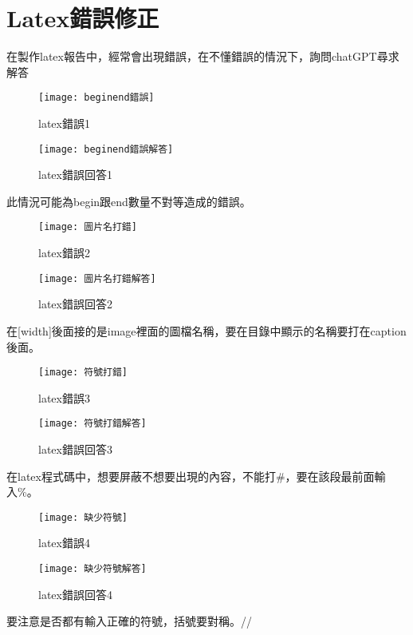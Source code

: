 \chapter{Latex錯誤修正}
在製作latex報告中，經常會出現錯誤，在不懂錯誤的情況下，詢問chatGPT尋求解答
\begin{figure}[ht]
  \begin{minipage}{0.5\textwidth}
    \centering
    \texttt{[image: beginend錯誤]}
    \caption{latex錯誤1}
  \end{minipage}%
  \begin{minipage}{0.5\textwidth}
    \centering
    \texttt{[image: beginend錯誤解答]}
    \caption{latex錯誤回答1}
  \end{minipage}
\end{figure}
此情況可能為begin跟end數量不對等造成的錯誤。\\
\begin{figure}[ht]
  \begin{minipage}{0.5\textwidth}
    \centering
    \texttt{[image: 圖片名打錯]}
    \caption{latex錯誤2}
  \end{minipage}%
  \begin{minipage}{0.5\textwidth}
    \centering
    \texttt{[image: 圖片名打錯解答]}
    \caption{latex錯誤回答2}
  \end{minipage}
\end{figure}
在[width]後面接的是image裡面的圖檔名稱，要在目錄中顯示的名稱要打在caption後面。\\

\begin{figure}[ht]
  \begin{minipage}{0.5\textwidth}
    \centering
    \texttt{[image: 符號打錯]}
    \caption{latex錯誤3}
  \end{minipage}%
  \begin{minipage}{0.5\textwidth}
    \centering
    \texttt{[image: 符號打錯解答]}
    \caption{latex錯誤回答3}
  \end{minipage}
\end{figure}
在latex程式碼中，想要屏蔽不想要出現的內容，不能打\#，要在該段最前面輸入\%。\\

\begin{figure}[ht]
  \begin{minipage}{0.5\textwidth}
    \centering
    \texttt{[image: 缺少符號]}
    \caption{latex錯誤4}
  \end{minipage}%
  \begin{minipage}{0.5\textwidth}
    \centering
    \texttt{[image: 缺少符號解答]}
    \caption{latex錯誤回答4}
  \end{minipage}
\end{figure}
要注意是否都有輸入正確的符號，括號要對稱。//

